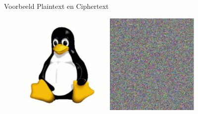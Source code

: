 \documentclass{beamer}
\begin{document}
\begin{frame}{Voorbeeld Plaintext en Ciphertext}
\begin{center}
\begin{figure}
	\includegraphics[width=0.40\textwidth]{img/tux.png}
	\quad
	\includegraphics[width=0.40\textwidth]{img/tux_secure.png}
\end{figure}
\end{center}
\end{frame}
\end{document}
